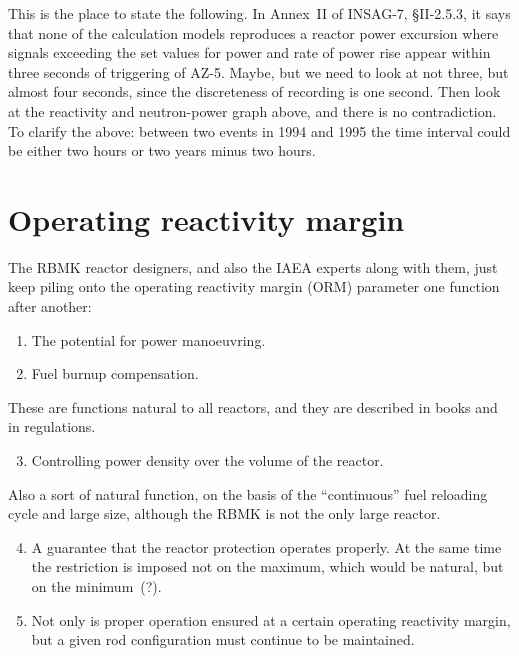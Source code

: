 \documentclass[openright]{bookest}
\begin{document}
This is the place to state the following. In Annex~II of INSAG-7, §II-2.5.3, it says that none of the calculation models reproduces a reactor power excursion where signals exceeding the set values for power and rate of power rise appear within three seconds of triggering of AZ-5. Maybe, but we need to look at not three, but almost four seconds, since the discreteness of recording is one second. Then look at the reactivity and neutron-power graph above, and there is no contradiction. To clarify the above: between two events in 1994 and 1995 the time interval could be either two hours or two years minus two hours.

\section*{Operating reactivity margin}

The RBMK reactor designers, and also the IAEA experts along with them, just keep piling onto the operating reactivity margin (ORM) parameter one function after another:

\begin{enumerate}
\item The potential for power manoeuvring.
\item Fuel burnup compensation.
\end{enumerate}

These are functions natural to all reactors, and they are described in books and in regulations.

\begin{enumerate}\setcounter{enumi}{2}
\item Controlling power density over the volume of the reactor.
\end{enumerate}

Also a sort of natural function, on the basis of the ``continuous'' fuel reloading cycle and large size, although the RBMK is not the only large reactor.

\begin{enumerate}\setcounter{enumi}{3}
\item A guarantee that the reactor protection operates properly. At the same time the restriction is imposed not on the maximum, which would be natural, but on the minimum~(?).
\item Not only is proper operation ensured at a certain operating reactivity margin, but a given rod configuration must continue to be maintained.
\end{enumerate}
\end{document}

